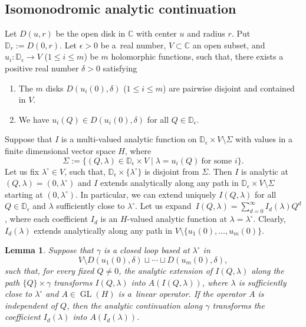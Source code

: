 \documentclass[pdftex]{sigma}
\numberwithin{equation}{section}
\newtheorem{Lemma}[Theorem]{Lemma}
\newcommand{\CC}{\mathbb{C}}
\begin{document}
\subsection{Isomonodromic analytic continuation}\label{sec:iso_ac}

Let $D(u,r)$ be the open disk in $\CC$ with center $u$ and radius $r$. Put $\mathbb{D}_r:= D(0,r)$. Let $\epsilon>0$ be a~real number, $V\subset \CC$ an open subset, and $u_i\colon\mathbb{D}_\epsilon \to V$ ($1\leq i\leq m$) be $m$ holomorphic functions, such that, there exists a positive real number $\delta>0$ satisfying
\begin{enumerate}\itemsep=0pt
\item[(i)]
The $m$ disks $D(u_i(0),\delta)$ ($1\leq i\leq m$) are pairwise disjoint and contained in $V$.
\item[(ii)]
We have $u_i(Q)\in D(u_i(0),\delta)$ for all $Q\in \mathbb{D}_\epsilon$.
\end{enumerate}
Suppose that $I$ is a multi-valued analytic function on $\mathbb{D}_\epsilon\times V\setminus{\Sigma}$ with values in a finite dimensional vector space $H$, where
\[
\Sigma:=\{
(Q,\lambda)\in \mathbb{D}_\epsilon\times V\mid
\lambda=u_i(Q)\ \mbox{for some $i$}
\}.
\]
Let us fix $\lambda^\circ\in V$, such that, $\mathbb{D}_\epsilon\times \{\lambda^\circ\}$ is disjoint from $\Sigma$. Then $I$ is analytic at $(Q,\lambda)=(0,\lambda^\circ)$ and $I$ extends analytically along any path in
$\mathbb{D}_\epsilon\times V\setminus{\Sigma}$ starting at $(0,\lambda^\circ)$. In particular, we can extend uniquely $I(Q,\lambda)$ for all $Q\in \mathbb{D}_\epsilon$ and $\lambda$ sufficiently close to $\lambda^\circ$.
Let us expand~${I(Q,\lambda)=\sum_{d=0}^\infty I_d(\lambda) Q^d}$, where each coefficient $I_d$ is an $H$-valued analytic function at $\lambda=\lambda^\circ$. Clearly, $I_d(\lambda)$ extends analytically along any path in $V\setminus{\{u_1(0),\dots,u_m(0)\}}$.
\begin{Lemma}\label{le:iso_ac}
Suppose that $\gamma$ is a closed loop based at $\lambda^\circ$ in
\[
V\setminus{D(u_1(0),\delta)\sqcup\cdots \sqcup D(u_m(0),\delta)},
\]
such that, for every fixed $Q\neq 0$, the analytic extension of $I(Q,\lambda)$ along the path $\{Q\}\times \gamma$ transforms $I(Q,\lambda)$ into $A(I(Q,\lambda))$, where $\lambda$ is sufficiently close to $\lambda^\circ$ and $A\in \operatorname{GL}(H)$ is a~linear operator. If the operator $A$ is independent of $Q$, then the analytic continuation along $\gamma$ transforms the coefficient $I_d(\lambda)$ into $A(I_d(\lambda))$.
\end{Lemma}
\end{document}
